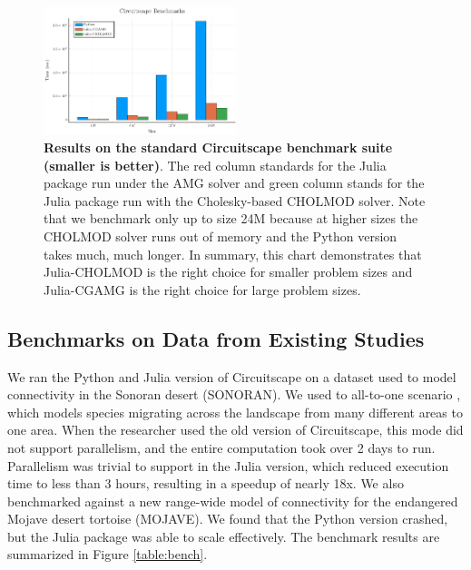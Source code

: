 \documentclass{juliacon}
\begin{document}
\begin{figure}
    \centering
    \includegraphics[width=0.5\textwidth]{bench.pdf}
    \caption{\textbf{Results on the standard Circuitscape benchmark suite (smaller is better)}. The red column standards for the Julia package run under the AMG solver and green column stands for the Julia package run with the Cholesky-based CHOLMOD solver. Note that we benchmark only up to size 24M because at higher sizes the CHOLMOD solver runs out of memory and the Python version takes much, much longer. In summary, this chart demonstrates that Julia-CHOLMOD is the right choice for smaller problem sizes and Julia-CGAMG is the right choice for large problem sizes.}
    \label{fig:csbench}
\end{figure}

\subsection{Benchmarks on Data from Existing Studies}

We ran the Python and Julia version of Circuitscape on a dataset used to model connectivity in the Sonoran desert \cite{drake2017using} (SONORAN). We used to all-to-one scenario \cite{mcrae2009circuitscape}, which models species migrating across the landscape from many different areas to one area. When the researcher used the old version of Circuitscape, this mode did not support parallelism, and the entire computation took over 2 days to run. Parallelism was trivial to support in the Julia version, which reduced execution time to less than 3 hours, resulting in a speedup of nearly 18x. We also benchmarked against a new range-wide model of connectivity for the endangered Mojave desert tortoise \cite{gray2019}(MOJAVE). We found that the Python version crashed, but the Julia package was able to scale effectively. The benchmark results are summarized in Figure \ref{table:bench}. 
\end{document}
